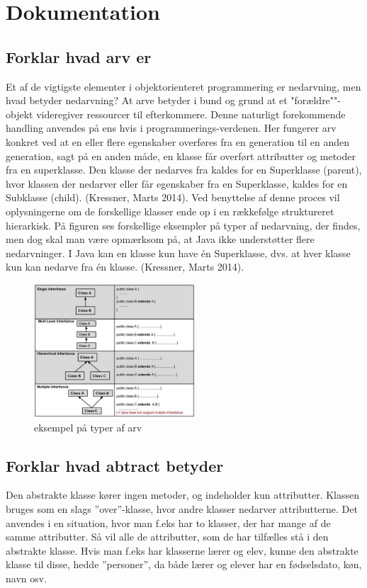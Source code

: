\section{Dokumentation}
\subsection{Forklar hvad arv er}
Et af de vigtigste elementer i objektorienteret programmering er nedarvning, men hvad betyder nedarvning? At arve betyder i bund og grund at et "forældre""-objekt videregiver ressourcer til efterkommere. Denne naturligt forekommende handling anvendes på ens hvis i programmerings-verdenen. Her fungerer arv konkret ved at en eller flere egenskaber overføres fra en generation til en anden generation, sagt på en anden måde, en klasse får overført attributter og metoder fra en superklasse. Den klasse der nedarves fra kaldes for en Superklasse (parent), hvor klassen der nedarver eller får egenskaber fra en Superklasse, kaldes for en Subklasse (child). (Kressner, Marts 2014).
Ved benyttelse af denne proces vil oplysningerne om de forskellige klasser ende op i en rækkefølge struktureret hierarkisk. 
På figuren ses forskellige eksempler på typer af nedarvning, der findes, men dog skal man være opmærksom på, at Java ikke understøtter flere nedarvninger. I Java kan en klasse kun have én Superklasse, dvs. at hver klasse kun kan nedarve fra én klasse. (Kressner, Marts 2014).
\begin{figure}[h]\label{fig:types_of_inheritance.jpg} 
    \advance\leftskip-3cm
    \includegraphics[width=6cm]{fig/types_of_inheritance.jpg}
    \caption{eksempel på typer af arv}
\end{figure}
\subsection{Forklar hvad abtract betyder}
Den abstrakte klasse kører ingen metoder, og indeholder kun attributter. Klassen bruges som en slags ”over”-klasse, hvor andre klasser nedarver attributterne. Det anvendes i en situation, hvor man f.eks har to klasser, der har mange af de samme attributter. Så vil alle de attributter, som de har tilfælles stå i den abstrakte klasse.
Hvis man f.eks har klasserne lærer og elev, kunne den abstrakte klasse til disse, hedde ”personer”, da både lærer og elever har en fødselsdato, køn, navn osv.

